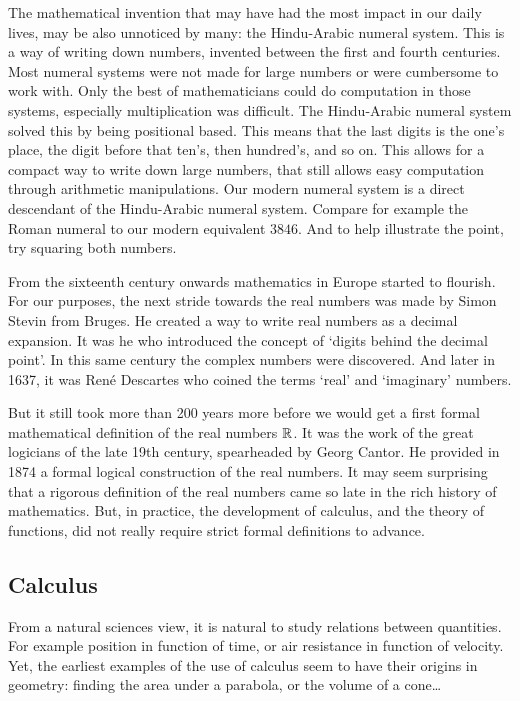 The mathematical invention that may have had the most impact in our daily lives, may be also unnoticed by many: the Hindu-Arabic numeral system. This is a way of writing down numbers, invented between the first and fourth centuries. Most numeral systems were not made for large numbers or were cumbersome to work with. Only the best of mathematicians could do computation in those systems, especially multiplication was difficult. The Hindu-Arabic numeral system solved this by being positional based. This means that the last digits is the one's place, the digit before that ten's, then hundred's, and so on. This allows for a compact way to write down large numbers, that still allows easy computation through arithmetic manipulations. Our modern numeral system is a direct descendant of the Hindu-Arabic numeral system. Compare for example the Roman numeral \uppercase\expandafter{\relax} to our modern equivalent $3846$. And to help illustrate the point, try squaring both numbers.

From the sixteenth century onwards mathematics in Europe started to flourish. For our purposes, the next stride towards the real numbers was made by Simon Stevin from Bruges. He created a way to write real numbers as a decimal expansion. It was he who introduced the concept of `digits behind the decimal point'. In this same century the complex numbers were discovered. And later in 1637, it was René Descartes who coined the terms `real' and `imaginary' numbers.

But it still took more than 200 years more before we would get a first formal mathematical definition of the real numbers $\mathbb{R}$. It was the work of the great logicians of the late 19th century, spearheaded by Georg Cantor. He provided in 1874 a formal logical construction of the real numbers. It may seem surprising that a rigorous definition of the real numbers came so late in the rich history of mathematics. But, in practice, the development of calculus, and the theory of functions, did not really require strict formal definitions to advance.

\subsection{Calculus}

From a natural sciences view, it is natural to study relations between quantities. For example position in function of time, or air resistance in function of velocity. Yet, the earliest examples of the use of calculus seem to have their origins in geometry: finding the area under a parabola, or the volume of a cone\dots

